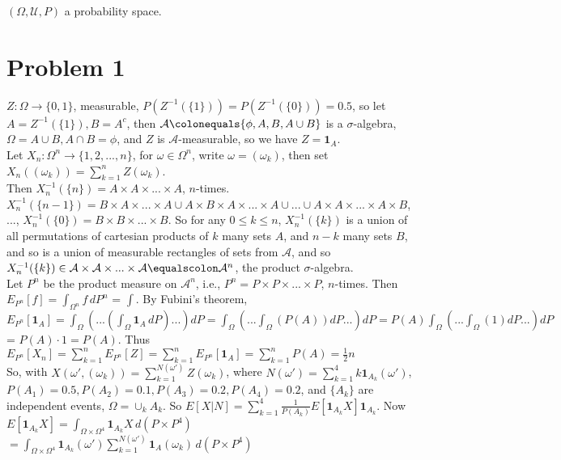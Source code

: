\documentclass[12pt]{article}
\newcommand{\A}[0] { \mathcal{A} }
\newcommand{\U}[0] { \mathcal{U} }
\newcommand{\om}[0] { \omega }
\newcommand{\Om}[0] { \Omega }
\newcommand{\rarw}[0] { \rightarrow }
\newcommand{ \defeq }[0] { \colonequals }
\newcommand{ \eqdef }[0] { \equalscolon }
\newcommand{ \cf }[1] { \mathbf{1}_{#1} }
\begin{document}
$(\Om, \U, P)$ a probability space.

\section*{Problem 1}

$Z: \Om \rarw \{ 0, 1\}$, measurable, $P(Z^{-1}(\{1\})) = P(Z^{-1}(\{0\})) = 0.5 $, so let $A = Z^{-1}(\{1\}), B = A^c$, then $\A \defeq \{ \phi, A, B, A \cup B \}$ is a $\sigma$-algebra, $\Om = A \cup B, A \cap B = \phi$, and $Z$ is $\A$-measurable, so we have $Z = \cf{A}$.\\

\noindent
Let $X_n : \Om^n \rarw \{ 1,2,...,n\}$, for $\om \in \Om^n$, write $\om = (\om_k)$, then set $X_n( (\om_k) ) = \sum_{k=1}^n Z(\om_k)$. \\

\noindent 
Then $X_n^{-1}(\{n\}) = A \times A \times ... \times A$, $n$-times. $X_n^{-1}(\{n-1\}) = B \times A \times ... \times A \cup A \times B \times A \times ... \times A \cup ... \cup  A \times A \times ... \times A \times B$, $...$, $X_n^{-1}(\{0\}) = B \times B \times ... \times B$. So for any $0 \le k \le n$, $X_n^{-1}(\{k\})$ is a union of all permutations of cartesian products of $k$ many sets $A$, and $n-k$ many sets $B$, and so is a union of measurable rectangles of sets from $\A$, and so  $X_n^{-1}(\{k\}) \in \A \times \A \times ... \times \A \eqdef \A^n$, the product $\sigma$-algebra.\\

\noindent
Let $P^n$ be the product measure on $\A^n$,  i.e., $P^n = P \times P \times ... \times P$, $n$-times. Then $E_{P^n}[ f ] = \int_{\Om^n} f \, dP^n$ = 
$ \int  $. By Fubini's theorem, $E_{P^n}[ \cf{A} ] = \int_\Om \left( ... \left( \int_\Om \cf{A} \, dP  \right) ... \right)  dP  =  \int_\Om \left( ...  \int_\Om  \left( P(A)  \right) dP ... \right)  dP = P(A)  \int_\Om \left( ...  \int_\Om  \left( 1  \right) dP ... \right)  dP $ = $P(A) \cdot 1 = P(A)$. Thus $ E_{P^n}[ X_n ] = \sum_{k=1} ^n  E_{P^n}[ Z ] = \sum_{k=1} ^n  E_{P^n}[ \cf{A} ] =  \sum_{k=1} ^n  P(A) = \frac{1}{2} n $\\

\noindent
So, with $X(\om', (\om_k)) = \sum_{k=1}^{N(\om')} Z(\om_k)$, where $N(\om') = \sum_{k=1}^4 k \cf{A_k}(\om')$, $P(A_1) = 0.5, P(A_2) = 0.1, P(A_3) = 0.2, P(A_4) = 0.2$, and $\{A_k\}$ are independent events, $\Om = \cup_k A_k$. So $E[X|N] = \sum_{k=1}^4 \frac{1}{P(A_k)} E[\cf{A_k}X] \cf{A_k}$. Now $E[ \cf{A_k}X ] = \int_{\Om \times \Om^4} \cf{A_k}X \,d(P \times P^4)    $ $= \int_{\Om \times \Om^4} \cf{A_k}(\om') \sum_{k=1}^{N(\om')} \cf{A}(\om_k) \,d(P \times P^4)   $
\end{document}
